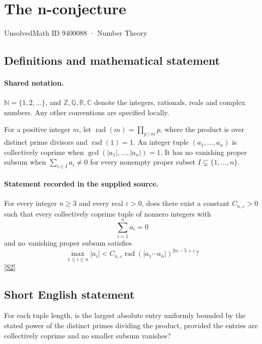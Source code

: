 \documentclass[11pt]{article}
\newcommand{\sref}[2]{\hyperlink{source:#1:#2}{[S#2]}}
\begin{document}
\setcounter{section}{9400087}
\section{The n-conjecture}\label{9400088}
{\small\sffamily UnsolvedMath ID 9400088 · Number Theory}
\subsection{Definitions and mathematical statement}

\paragraph{Shared notation.}$\mathbb N=\{1,2,\ldots\}$, and $\mathbb Z,\mathbb Q,\mathbb R,\mathbb C$ denote the integers, rationals, reals and complex numbers. Any other conventions are specified locally.


For a positive integer $m$, let $\operatorname{rad}(m)=\prod_{p\mid m}p$, where the product is over distinct prime divisors and $\operatorname{rad}(1)=1$. An integer tuple $(a_1,\ldots,a_n)$ is collectively coprime when $\gcd(|a_1|,\ldots,|a_n|)=1$. It has no vanishing proper subsum when $\sum_{i\in I}a_i\ne0$ for every nonempty proper subset $I\subsetneq\{1,\ldots,n\}$.
\paragraph{Statement recorded in the supplied source.}
For every integer $n\ge3$ and every real $\varepsilon>0$, does there exist a constant $C_{n,\varepsilon}>0$ such that every collectively coprime tuple of nonzero integers with
\[\sum_{i=1}^n a_i=0\]
and no vanishing proper subsum satisfies
\[\max_{1\le i\le n}|a_i|<C_{n,\varepsilon}\operatorname{rad}(|a_1\cdots a_n|)^{2n-5+\varepsilon}?\] \sref{9400088}{2}
\subsection{Short English statement}
For each tuple length, is the largest absolute entry uniformly bounded by the stated power of the distinct primes dividing the product, provided the entries are collectively coprime and no smaller subsum vanishes?
\end{document}

